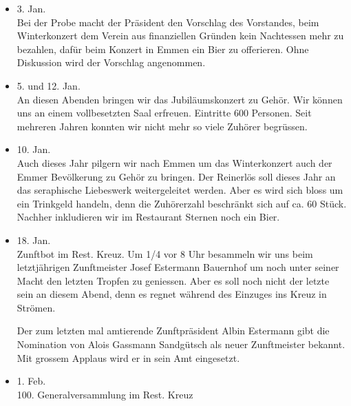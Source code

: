 \begin{multicols}{2}


    \begin{itemize}
        \item[]3. Jan.\\
        Bei der Probe macht der Präsident den Vorschlag
        des Vorstandes, beim Winterkonzert dem Verein aus finanziellen
        Gründen kein Nachtessen mehr zu bezahlen, dafür beim
        Konzert in Emmen ein Bier zu offerieren. Ohne
        Diskussion wird der Vorschlag angenommen.

        \item[]5. und 12. Jan.\\
        An diesen Abenden bringen wir das Jubiläumskonzert
        zu Gehör. Wir können uns an einem vollbesetzten
        Saal erfreuen. Eintritte 600 Personen. Seit mehreren Jahren
        konnten wir nicht mehr so viele Zuhörer begrüssen.

        \item[]10. Jan.\\
        Auch dieses Jahr pilgern wir nach Emmen um das
        Winterkonzert auch der Emmer Bevölkerung zu Gehör zu
        bringen. Der Reinerlös soll dieses Jahr an das seraphische
        Liebeswerk weitergeleitet werden. Aber es wird sich bloss um ein
        Trinkgeld handeln, denn die Zuhörerzahl beschränkt sich auf
        ca. 60 Stück. Nachher inkludieren wir im Restaurant
        Sternen noch ein Bier.

        \item[]18. Jan.\\
        Zunftbot im Rest. Kreuz. Um 1/4 vor 8 Uhr besammeln
        wir uns beim letztjährigen Zunftmeister Josef Estermann
        Bauernhof um noch unter seiner Macht den letzten Tropfen
        zu geniessen. Aber es soll noch nicht der letzte sein an diesem
        Abend, denn es regnet während des Einzuges ins Kreuz in Strömen.

        Der zum letzten mal amtierende Zunftpräsident
        Albin Estermann gibt die Nomination von Alois
        Gassmann Sandgütsch als neuer Zunftmeister bekannt.
        Mit grossem Applaus wird er in sein Amt eingesetzt.

        \item[]1. Feb.\\
        100. Generalversammlung im Rest. Kreuz


\end{itemize}
\end{multicols}
